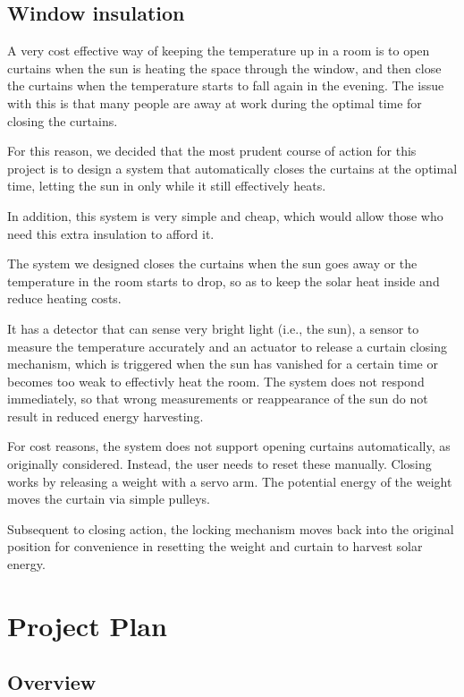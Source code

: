 \documentclass[a4paper,12pt]{article}
\begin{document}
\subsection{Window insulation}

A very cost effective way of keeping the temperature up in a room is to open curtains when the sun is heating the space through the window, 
and then close the curtains when the temperature starts to fall again in the evening. 
The issue with this is that many people are away at work during the optimal time for closing the curtains.

For this reason, we decided that the most prudent course of action for this project is to design a system that automatically closes the curtains at the optimal time, 
letting the sun in only while it still effectively heats. 

In addition, this system is very simple and cheap, which would allow those who need this extra insulation to afford it.

The system we designed closes the curtains when the sun goes away or the temperature in the room starts to drop, so as to keep the solar heat inside 
and reduce heating costs.

It has a detector that can sense very bright light (i.e., the sun), a sensor to measure the temperature accurately and an actuator to 
release a curtain closing mechanism, which is triggered when the sun has vanished for a certain time or becomes too weak to effectivly heat the room.
 The system does not respond immediately, so that wrong measurements or reappearance of the sun do not result in reduced energy harvesting.


For cost reasons, the system does not support opening curtains automatically, as originally considered. Instead, the user needs to reset these manually.
Closing works by releasing a weight with a servo arm. The potential energy of the weight moves the curtain via simple pulleys.

Subsequent to closing action, the locking mechanism moves back into the original position for convenience in resetting the weight and curtain 
to harvest solar energy.

\section{Project Plan}

\subsection{Overview}
\end{document}
